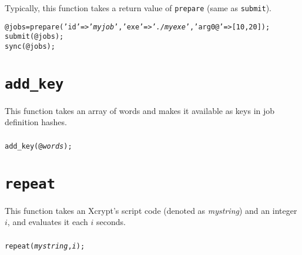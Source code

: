 \documentclass[a4paper,10pt]{report}
\begin{document}
\subsubsection{\example}

Typically, this function takes a return value of \texttt{prepare}
(same as \texttt{submit}).
\begin{boxnote}
\begin{alltt}
@jobs = prepare('id' => '\textit{myjob}', 'exe' => '\textit{./myexe}', 'arg0@' => [10,20]);
submit(@jobs);
sync(@jobs);
\end{alltt}
\end{boxnote}

\section{\texttt{add\_key}}

This function takes an array of words and makes it available as keys in job
definition hashes.

\subsubsection{\format}

\begin{boxnote}
\begin{alltt}
add_key(@\textit{words});
\end{alltt}
\end{boxnote}
\vspace{\baselineskip}

\section{\texttt{repeat}}

This function takes an Xcrypt's script code (denoted as
\textit{mystring}) and an integer $i$, and evaluates it each $i$ seconds.

\subsubsection{\format}

\begin{boxnote}
\begin{alltt}
repeat(\textit{mystring}, \textit{i});
\end{alltt}
\end{boxnote}
\vspace{\baselineskip}
\end{document}
